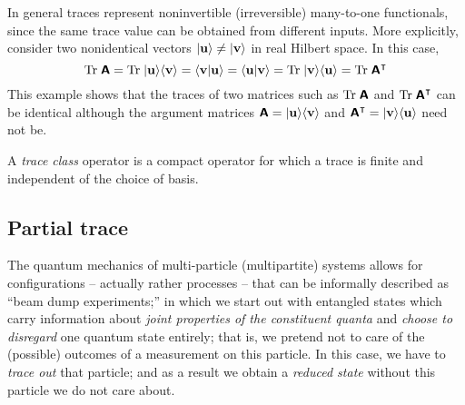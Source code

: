 In general traces represent noninvertible (irreversible) many-to-one functionals, since the same trace value can be obtained from different inputs.
More explicitly, consider two nonidentical vectors  $\vert {\bf u} \rangle \neq \vert {\bf v} \rangle$ in real Hilbert space.
In this case,
\begin{equation}
\textrm{Tr}\;\textsf{\textbf{A}} =
\textrm{Tr}\;\vert {\bf u} \rangle \langle {\bf v} \rangle =
\langle {\bf v} \vert  {\bf u} \rangle
=
\langle {\bf u} \vert  {\bf v} \rangle =
\textrm{Tr}\;\vert {\bf v} \rangle \langle {\bf u} \rangle =
\textrm{Tr}\;\textsf{\textbf{A}}^\intercal
\end{equation}
This example shows that the traces of two matrices such as $\textrm{Tr}\;\textsf{\textbf{A}}$ and $\textrm{Tr}\;\textsf{\textbf{A}}^\intercal  $ can be identical although
the argument matrices  $\textsf{\textbf{A}}=\vert {\bf u} \rangle \langle {\bf v} \rangle
$ and $\textsf{\textbf{A}}^\intercal   = \vert {\bf v} \rangle \langle {\bf u} \rangle$ need not be.




A {\em trace class} operator is a compact operator for which a trace is finite and independent of the choice of basis.

\subsection{Partial trace}
\label{2015-partialtrace}

The quantum mechanics of multi-particle (multipartite) systems allows for configurations -- actually rather processes --
that can be informally described as ``beam dump experiments;'' in which we start out with entangled states
 which carry information
about {\em joint properties of the constituent quanta}
and {\em choose to disregard} one quantum state entirely; that is, we pretend
not to care of the (possible) outcomes of a measurement on this particle.
In this case, we have to {\em trace out} that particle; and as a result we obtain a {\em reduced state} without this particle we do
not care about.

